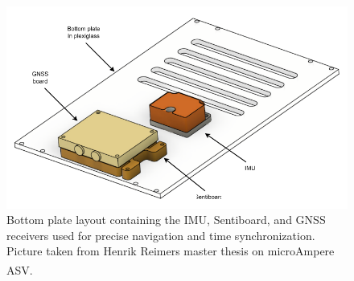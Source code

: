 \begin{figure}[H]
    \centering
    \includegraphics[width=0.8\linewidth]{Pictures/Hardware/Layout/BoxBottomPlateTop.png}
    \caption{Bottom plate layout containing the IMU, Sentiboard, and GNSS receivers used for precise navigation and time synchronization. Picture taken from Henrik Reimers master thesis on microAmpere ASV.\textsuperscript{\cite{microAmpere_hardware_master_thesis1}}}
    \label{fig:microAmpere-layout-bottomplate}
\end{figure}
